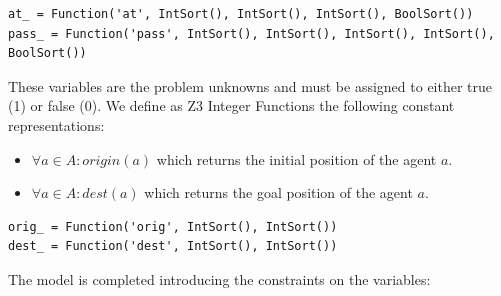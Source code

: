 \documentclass[12pt, a4paper, hidelinks]{article}
\numberwithin{equation}{section}
\begin{document}
\begin{lstlisting}[label={lst:atpass}]
at_ = Function('at', IntSort(), IntSort(), IntSort(), BoolSort())
pass_ = Function('pass', IntSort(), IntSort(), IntSort(), IntSort(), BoolSort())
\end{lstlisting}

These variables are the problem unknowns and must be assigned to either true (1) or false (0).
We define as Z3 Integer Functions the following constant representations:

\begin{itemize}
\item $\forall a \in A : origin(a)$ which returns the initial position of the agent $a$.
\item $\forall a \in A : dest(a)$ which returns the goal position of the agent $a$.
\end{itemize}

\begin{lstlisting}[label={lst:origdest}]
orig_ = Function('orig', IntSort(), IntSort())
dest_ = Function('dest', IntSort(), IntSort())
\end{lstlisting}

The model is completed introducing the constraints on the variables:
\end{document}
